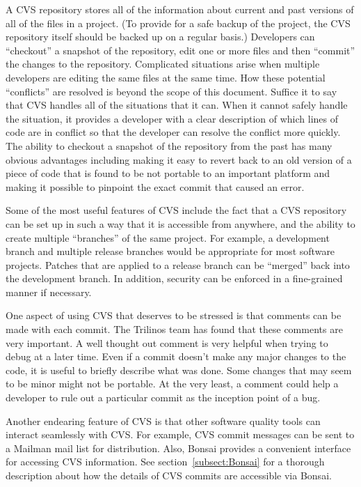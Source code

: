 \documentclass[12pt,relax]{article}
\begin{document}
A CVS repository stores all of the information about current and past versions
of all of the files in a project.  (To provide for a safe backup of the 
project, the CVS repository itself should be backed up on a regular basis.)  
Developers can ``checkout'' a snapshot of 
the repository, edit one or more files and then ``commit'' the changes to the
repository.  Complicated situations arise when multiple developers are 
editing the same files at the same time.  How these potential ``conflicts'' 
are resolved is beyond the scope of this document.  Suffice it to say that 
CVS handles all of the situations that it can.  When it cannot safely handle 
the situation, it provides a developer with a clear description of which 
lines of code are in conflict so that the developer can resolve the 
conflict more quickly.  The ability to checkout a snapshot of the 
repository from the past has many obvious advantages including making it easy 
to revert back to an old version of a piece of code that is found to be not 
portable to an important platform and making it possible to pinpoint the exact 
commit that caused an error.

Some of the most useful features of CVS include the fact that a CVS 
repository can be set up in such a way that it is accessible from anywhere, 
and the ability to create multiple ``branches'' of the same project.  For 
example, a development branch and multiple release branches would be 
appropriate for most software projects.  Patches that are applied 
to a release branch can be ``merged'' back into the development branch.  
In addition, security can be enforced in a fine-grained manner if necessary.  

One aspect of using CVS that deserves to be stressed is that comments can be 
made with each commit.  The Trilinos team has found that these comments are 
very important.  A well thought out comment is very helpful when trying to 
debug at a later time.  Even if a commit doesn't make any major changes to the 
code, it is useful to briefly describe what was done.  Some changes that may 
seem to be minor might not be portable.  At the very least, a comment could 
help a developer to rule out a particular commit as the inception point 
of a bug.

Another endearing feature of CVS is that other software quality tools can 
interact seamlessly with CVS.  For example, CVS commit messages can be sent to
a Mailman mail list for distribution.  Also, Bonsai provides a convenient 
interface for accessing CVS information.  See section~\ref{subsect:Bonsai} 
for a thorough description about how the details of CVS commits are accessible 
via Bonsai.
\end{document}
